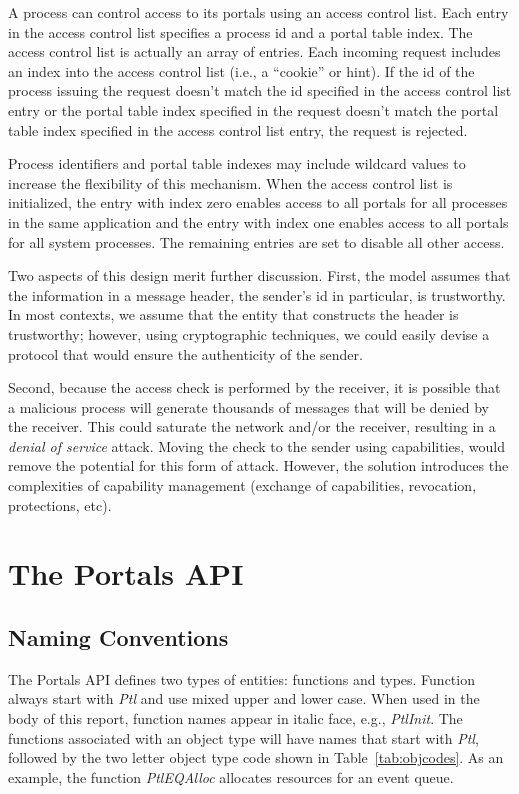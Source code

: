 \documentclass{sand-report}
\begin{document}
A process can control access to its portals using an access control
list.  Each entry in the access control list specifies a process id
and a portal table index.  The access control list is actually an
array of entries.  Each incoming request includes an index into the
access control list (i.e., a ``cookie'' or hint).  If the id of the
process issuing the request doesn't match the id specified in the
access control list entry or the portal table index specified in the
request doesn't match the portal table index specified in the access
control list entry, the request is rejected.

Process identifiers and portal table indexes may include wildcard values to
increase the flexibility of this mechanism.  When the access control
list is initialized, the entry with index zero enables access to all
portals for all processes in the same application and the entry with
index one enables access to all portals for all system processes.  The
remaining entries are set to disable all other access.

Two aspects of this design merit further discussion.  First, the model
assumes that the information in a message header, the sender's id in
particular, is trustworthy.  In most contexts, we assume that the
entity that constructs the header is trustworthy; however, using
cryptographic techniques, we could easily devise a protocol that would
ensure the authenticity of the sender.

Second, because the access check is performed by the receiver, it is
possible that a malicious process will generate thousands of messages
that will be denied by the receiver.  This could saturate the network
and/or the receiver, resulting in a \emph{denial of service} attack.
Moving the check to the sender using capabilities, would remove the
potential for this form of attack.  However, the solution introduces
the complexities of capability management (exchange of capabilities,
revocation, protections, etc).

\section{The Portals API}\label{sec:api}

\subsection{Naming Conventions}\label{sec:conv}
The Portals API defines two types of entities: functions and types.
Function always start with \emph{Ptl} and use mixed upper and lower
case.  When used in the body of this report, function names appear in
italic face, e.g., \emph{PtlInit}.  The functions associated with an
object type will have names that start with \emph{Ptl}, followed by
the two letter object type code shown in Table~\ref{tab:objcodes}.  As
an example, the function \emph{PtlEQAlloc} allocates resources for an
event queue.
\end{document}
